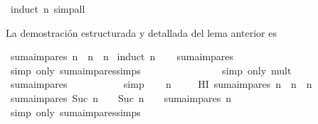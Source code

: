 \begin{isabellebody}
\isamarkupfalse%
\ {\isacharparenleft}induct\ n{\isacharparenright}\ simp{\isacharunderscore}all%
\endisatagproof
{\isafoldproof}%
%
\isadelimproof
%
\endisadelimproof
%
\begin{isamarkuptext}%
La demostración estructurada y detallada del lema anterior es%
\end{isamarkuptext}\isamarkuptrue%
\isamarkupfalse%
\ {\isachardoublequoteopen}suma{\isacharunderscore}impares\ n\ {\isacharequal}\ n\ {\isacharasterisk}\ n{\isachardoublequoteclose}\isanewline
%
\isadelimproof
%
\endisadelimproof
%
\isatagproof
{}\isamarkupfalse%
\ {\isacharparenleft}induct\ n{\isacharparenright}\isanewline
\ \ \isamarkupfalse%
\ {\isachardoublequoteopen}suma{\isacharunderscore}impares\ {}\ {\isacharequal}\ {}{\isachardoublequoteclose}\ \isanewline
\ \ \ \ \isamarkupfalse%
\ {\isacharparenleft}simp\ only{\isacharcolon}\ suma{\isacharunderscore}impares{\isachardot}simps{\isacharparenleft}{}{\isacharparenright}{\isacharparenright}\isanewline
\ \ \isamarkupfalse%
\ \isamarkupfalse%
\ {\isachardoublequoteopen}{\isasymdots}\ {\isacharequal}\ {}\ {\isacharasterisk}\ {}{\isachardoublequoteclose}\isanewline
\ \ \ \ \isamarkupfalse%
\ {\isacharparenleft}simp\ only{\isacharcolon}\ mult{\isacharunderscore}{}{\isacharparenright}\isanewline
\ \ \isamarkupfalse%
\ \isamarkupfalse%
\ {\isachardoublequoteopen}suma{\isacharunderscore}impares\ {}\ {\isacharequal}\ {}\ {\isacharasterisk}\ {}{\isachardoublequoteclose}\isanewline
\ \ \ \ \isamarkupfalse%
\ simp\isanewline
{}\isamarkupfalse%
\isanewline
\ \ \isamarkupfalse%
\ n\ \isanewline
\ \ \isamarkupfalse%
\ HI{\isacharcolon}\ {\isachardoublequoteopen}suma{\isacharunderscore}impares\ n\ {\isacharequal}\ n\ {\isacharasterisk}\ n{\isachardoublequoteclose}\isanewline
\ \ \isamarkupfalse%
\ {\isachardoublequoteopen}suma{\isacharunderscore}impares\ {\isacharparenleft}Suc\ n{\isacharparenright}\ {\isacharequal}\ {\isacharparenleft}{}\ {\isacharasterisk}\ {\isacharparenleft}Suc\ n{\isacharparenright}\ {\isacharminus}\ {}{\isacharparenright}\ {\isacharplus}\ suma{\isacharunderscore}impares\ n{\isachardoublequoteclose}\ \isanewline
\ \ \ \ \isamarkupfalse%
\ {\isacharparenleft}simp\ only{\isacharcolon}\ suma{\isacharunderscore}impares{\isachardot}simps{\isacharparenleft}{}{\isacharparenright}{\isacharparenright}\isanewline

\end{isabellebody}
